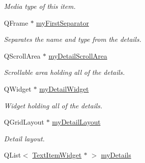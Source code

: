\begin{DoxyCompactItemize}
\begin{DoxyCompactList}\small\item\em Media type of this item. \end{DoxyCompactList}\item 
\hypertarget{class_u_i_1_1_info_pane_ae7fcdeadfe22b98dd5ea3a1a30705c7f}{Q\-Frame $\ast$ \hyperlink{class_u_i_1_1_info_pane_ae7fcdeadfe22b98dd5ea3a1a30705c7f}{my\-First\-Separator}}\label{class_u_i_1_1_info_pane_ae7fcdeadfe22b98dd5ea3a1a30705c7f}

\begin{DoxyCompactList}\small\item\em Separates the name and type from the details. \end{DoxyCompactList}\item 
\hypertarget{class_u_i_1_1_info_pane_aeb6497fa3f56c961083acb360291b9a5}{Q\-Scroll\-Area $\ast$ \hyperlink{class_u_i_1_1_info_pane_aeb6497fa3f56c961083acb360291b9a5}{my\-Detail\-Scroll\-Area}}\label{class_u_i_1_1_info_pane_aeb6497fa3f56c961083acb360291b9a5}

\begin{DoxyCompactList}\small\item\em Scrollable area holding all of the details. \end{DoxyCompactList}\item 
\hypertarget{class_u_i_1_1_info_pane_a279c8ddd14a546c48694e3ae4cb937b2}{Q\-Widget $\ast$ \hyperlink{class_u_i_1_1_info_pane_a279c8ddd14a546c48694e3ae4cb937b2}{my\-Detail\-Widget}}\label{class_u_i_1_1_info_pane_a279c8ddd14a546c48694e3ae4cb937b2}

\begin{DoxyCompactList}\small\item\em Widget holding all of the details. \end{DoxyCompactList}\item 
\hypertarget{class_u_i_1_1_info_pane_adabfa25d9b22dfe9ce86bbfdd3a59537}{Q\-Grid\-Layout $\ast$ \hyperlink{class_u_i_1_1_info_pane_adabfa25d9b22dfe9ce86bbfdd3a59537}{my\-Detail\-Layout}}\label{class_u_i_1_1_info_pane_adabfa25d9b22dfe9ce86bbfdd3a59537}

\begin{DoxyCompactList}\small\item\em Detail layout. \end{DoxyCompactList}\item 
\hypertarget{class_u_i_1_1_info_pane_a7dfeedc20ea4feed012b5b12bcac03bd}{Q\-List$<$ \hyperlink{class_u_i_1_1_text_item_widget}{Text\-Item\-Widget} $\ast$ $>$ \hyperlink{class_u_i_1_1_info_pane_a7dfeedc20ea4feed012b5b12bcac03bd}{my\-Details}}\label{class_u_i_1_1_info_pane_a7dfeedc20ea4feed012b5b12bcac03bd}


\end{DoxyCompactItemize}
